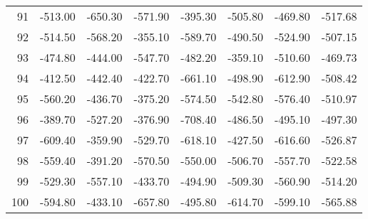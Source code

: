 \begin{longtable}{rrrrrrrr}
91 & -513.00 & -650.30 & -571.90 & -395.30 & -505.80 & -469.80 & -517.68  \\
92 & -514.50 & -568.20 & -355.10 & -589.70 & -490.50 & -524.90 & -507.15  \\
93 & -474.80 & -444.00 & -547.70 & -482.20 & -359.10 & -510.60 & -469.73  \\
94 & -412.50 & -442.40 & -422.70 & -661.10 & -498.90 & -612.90 & -508.42  \\
95 & -560.20 & -436.70 & -375.20 & -574.50 & -542.80 & -576.40 & -510.97  \\
96 & -389.70 & -527.20 & -376.90 & -708.40 & -486.50 & -495.10 & -497.30  \\
97 & -609.40 & -359.90 & -529.70 & -618.10 & -427.50 & -616.60 & -526.87  \\
98 & -559.40 & -391.20 & -570.50 & -550.00 & -506.70 & -557.70 & -522.58  \\
99 & -529.30 & -557.10 & -433.70 & -494.90 & -509.30 & -560.90 & -514.20  \\
100 & -594.80 & -433.10 & -657.80 & -495.80 & -614.70 & -599.10 & -565.88  \\

\end{longtable}


